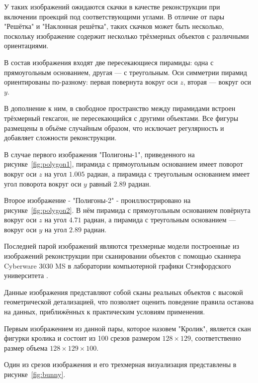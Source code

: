 У таких изображений ожидаются скачки в качестве реконструкции при включении проекций под соответствующими углами. В отличие от пары "Решётка" и "Наклонная решётка", таких скачков может быть несколько, поскольку изображение содержит несколько трёхмерных объектов с различными ориентациями.

В состав изображения входят две пересекающиеся пирамиды: одна с прямоугольным основанием, другая — с треугольным. Оси симметрии пирамид ориентированы по-разному: первая повернута вокруг оси \(z\), вторая — вокруг оси \(y\). 

В дополнение к ним, в свободное пространство между пирамидами встроен трёхмерный гексагон, не пересекающийся с другими объектами. Все фигуры размещены в объёме случайным образом, что исключает регулярность и добавляет сложности реконструкции.

В случае первого изображения "Полигоны-1", приведенного на рисунке~\ref{fig:polygon1}, пирамида с прямоугольным основанием имеет поворот вокруг оси \(z\) на угол \(1.005\) радиан, а пирамида с треугольным основанием имеет угол поворота вокруг оси \(y\) равный \(2.89\) радиан.


Второе изображение - "Полигоны-2" - проиллюстрировано на рисунке~\ref{fig:polygon2}. В нём пирамида с прямоугольным основанием повёрнута вокруг оси \(z\) на угол \(4.71\) радиан, а пирамида с треугольным основанием — вокруг оси \(y\) на угол \(2.89\) радиан.


Последней парой изображений являются трехмерные модели построенные из изображений реконструкции при сканировании  объектов с помощью сканнера  Cyberware 3030 MS в лаборатории компьютерной графики Стэнфордского университета \cite{stanfordRepository}.

Данные изображения представляют собой сканы реальных объектов с высокой геометрической детализацией, что позволяет оценить поведение правила останова на данных, приближённых к практическим условиям применения.

Первым изображением из данной пары, которое назовем "Кролик", является скан фигурки кролика и состоит из 100 срезов размером \(128 \times 129\), соответственно размер объема \(128 \times 129 \times 100\).

Один из срезов изображения и его трехмерная визуализация представлены в рисунке~\ref{fig:bunny}.

